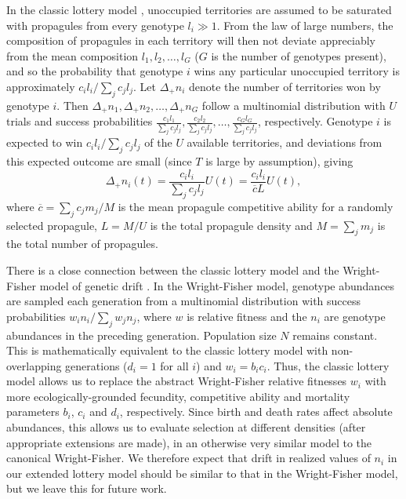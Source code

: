 \documentclass[11pt]{article}
\begin{document}
In the classic lottery model \citep{chesson_1981}, unoccupied territories are assumed to be saturated with propagules from every genotype $l_i\gg 1$. From the law of large numbers, the composition of propagules in each territory will then not deviate appreciably from the mean composition $l_1,l_2,\ldots,l_G$ ($G$ is the number of genotypes present), and so the probability that genotype $i$ wins any particular unoccupied territory is approximately $c_i l_i/\sum_j c_j l_j$. Let $\Delta_+ n_i$ denote the number of territories won by genotype $i$. Then $\Delta_+ n_1,\Delta_+ n_2,\ldots,\Delta_+ n_G$ follow a multinomial distribution with $U$ trials and success probabilities $\frac{c_1 l_1}{\sum_j c_j l_j},\frac{c_2 l_2}{\sum_j c_j l_j},\ldots,\frac{c_G l_G}{\sum_j c_j l_j}$, respectively. Genotype $i$ is expected to win $c_i l_i/\sum_j c_j l_j$ of the $U$ available territories, and deviations from this expected outcome are small (since $T$ is large by assumption), giving 
\begin{equation}
\Delta_+ n_i(t)=\frac{c_i l_i}{\sum_j c_j l_j}U(t)=\frac{c_i l_i}{\overline{c}L}U(t), \label{eq:lottery}
\end{equation}
where $\overline{c}=\sum_j c_j m_j/M$ is the mean propagule competitive ability for a randomly selected propagule, $L=M/U$ is the total propagule density and $M=\sum_j m_j$ is the total number of propagules. 

There is a close connection between the classic lottery model and the Wright-Fisher model of genetic drift \citep{svardal_2015}. In the Wright-Fisher model, genotype abundances are sampled each generation from a multinomial distribution with success probabilities $w_i n_i/\sum_j w_j n_j$, where $w$ is relative fitness and the $n_i$ are  genotype abundances in the preceding generation. Population size $N$ remains constant. This is mathematically equivalent to the classic lottery model with non-overlapping generations ($d_i=1$ for all $i$) and $w_i=b_i c_i$. Thus, the classic lottery model allows us to replace the abstract Wright-Fisher relative fitnesses $w_i$ with more ecologically-grounded fecundity, competitive ability and mortality parameters $b_i$, $c_i$ and $d_i$, respectively. Since birth and death rates affect absolute abundances, this allows us to evaluate selection at different densities (after appropriate extensions are made), in an otherwise very similar model to the canonical Wright-Fisher. We therefore expect that drift in realized values of $n_i$ in our extended lottery model should be similar to that in the Wright-Fisher model, but we leave this for future work. 
\end{document}
